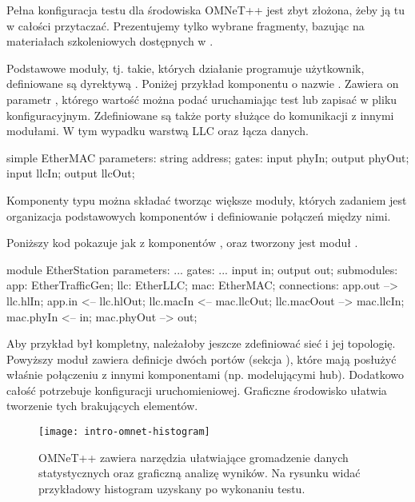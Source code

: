 \documentclass[00-praca-magisterska.tex]{subfiles}
\begin{document}
Pełna konfiguracja testu dla środowiska OMNeT++ jest zbyt złożona, żeby ją tu w
całości przytaczać. Prezentujemy tylko wybrane fragmenty, bazując na
materiałach szkoleniowych dostępnych w \cite{omnet-doc}.

Podstawowe moduły, tj. takie, których działanie programuje użytkownik,
definiowane są dyrektywą . Poniżej przykład komponentu o nazwie
. Zawiera on parametr , którego wartość można
podać uruchamiając test lub zapisać w pliku konfiguracyjnym. Zdefiniowane są
także porty służące do komunikacji z innymi modułami. W tym wypadku warstwą LLC
oraz łącza danych.

\begin{textcode}
  simple EtherMAC {
      parameters:
          string address;
      gates:
          input phyIn;
          output phyOut;
          input llcIn;
          output llcOut;
  }
\end{textcode}

Komponenty typu  można składać tworząc większe moduły, których
zadaniem jest organizacja podstawowych komponentów i definiowanie połączeń
między nimi.

Poniższy kod pokazuje jak z komponentów , 
oraz  tworzony jest moduł .

\begin{textcode}
  module EtherStation {
      parameters: ...
      gates: ...
          input in;
          output out;  
      submodules:
          app: EtherTrafficGen;
          llc: EtherLLC;
          mac: EtherMAC;
      connections:
          app.out --> llc.hlIn;
          app.in <-- llc.hlOut;
          llc.macIn <-- mac.llcOut;
          llc.macOout --> mac.llcIn;
          mac.phyIn <-- in;
          mac.phyOut --> out;
  }
\end{textcode}

Aby przykład był kompletny, należałoby jeszcze zdefiniować sieć i jej
topologię.  Powyższy moduł zawiera definicje dwóch portów (sekcja
), które mają posłużyć właśnie połączeniu z innymi komponentami
(np. modelującymi hub). Dodatkowo całość potrzebuje konfiguracji
uruchomieniowej. Graficzne środowisko ułatwia tworzenie tych brakujących elementów.

\begin{figure}
\begin{center}
\leavevmode
\texttt{[image: intro-omnet-histogram]}
\end{center}
\caption{OMNeT++ zawiera narzędzia ułatwiające gromadzenie
danych statystycznych oraz graficzną analizę wyników. Na rysunku widać
przykładowy histogram uzyskany po wykonaniu testu.}
\label{fig:intro-omnet-histogram}
\end{figure}
\end{document}
